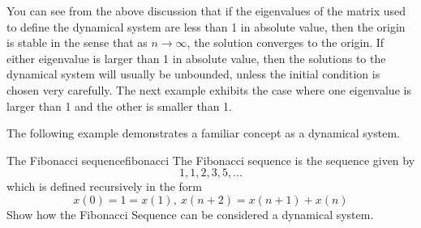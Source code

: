 You can see from the above discussion that if the eigenvalues of the matrix
used to define the dynamical system are less than 1 in absolute value, then
the origin is stable in the sense that as $n\rightarrow \infty$, the
solution converges to the origin. If either eigenvalue is larger than 1 in
absolute value, then the solutions to the dynamical system will usually be
unbounded, unless the initial condition is chosen very carefully. The next
example exhibits the case where one eigenvalue is larger than 1 and the
other is smaller than 1.

The following example demonstrates a familiar concept as a dynamical system.

\begin{example}{The Fibonacci sequence}{fibonacci}
The Fibonacci sequence is the sequence given by 
\begin{equation*}
1, 1, 2, 3, 5, \ldots
\end{equation*}
which is defined recursively in the
form
\begin{equation*}
x(0) =1=x(1) ,\ x(n+2) =x(
n+1) +x(n)
\end{equation*}
Show how the Fibonacci Sequence can be considered a dynamical system.
\end{example}

